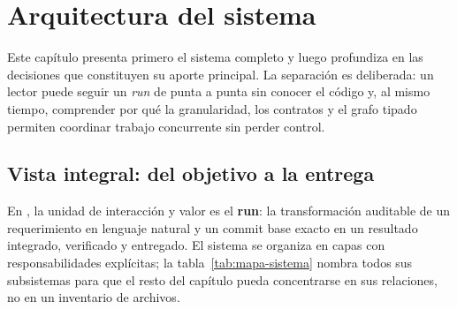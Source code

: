 \chapter{Arquitectura del sistema}
\label{cap:arquitectura}

Este capítulo presenta primero el sistema completo y luego profundiza en las
decisiones que constituyen su aporte principal. La separación es deliberada:
un lector puede seguir un \emph{run} de punta a punta sin conocer el código y,
al mismo tiempo, comprender por qué la granularidad, los contratos y el grafo
tipado permiten coordinar trabajo concurrente sin perder control.

\section{Vista integral: del objetivo a la entrega}

En \sistema, la unidad de interacción y valor es el \textbf{run}: la
transformación auditable de un requerimiento en lenguaje natural y un commit
base exacto en un resultado integrado, verificado y entregado. El sistema se
organiza en capas con responsabilidades explícitas; la tabla~\ref{tab:mapa-sistema}
nombra todos sus subsistemas para que el resto del capítulo pueda concentrarse
en sus relaciones, no en un inventario de archivos.

